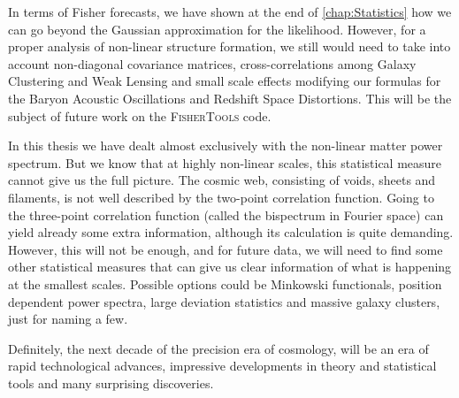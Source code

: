 In terms of Fisher forecasts, we have shown at the end of \cref{chap:Statistics} how we can go beyond the Gaussian approximation for the likelihood.
However, for a proper analysis of non-linear structure formation, we still would need to take into account 
non-diagonal covariance matrices, cross-correlations among Galaxy Clustering and Weak Lensing and small scale effects
modifying our formulas for the Baryon Acoustic Oscillations and Redshift Space Distortions. This will be the subject of future
work on the \textsc{FisherTools} code.

In this thesis we have dealt almost exclusively with the non-linear matter power spectrum. But we know that at highly non-linear scales,
this statistical measure cannot give us the full picture. The cosmic web, consisting of voids, sheets and filaments, is not
well described by the two-point correlation function. Going to the three-point correlation function (called the bispectrum in Fourier space)
can yield already some extra information, although its calculation is quite demanding. 
However, this will not be enough, and for future data, we will need to find
some other statistical measures that can give us clear information of what is happening at the smallest scales.
Possible options could be Minkowski functionals, position dependent power spectra, large deviation statistics and 
massive galaxy clusters, just for naming a few.

Definitely, the next decade of the precision era of cosmology, will be an era of rapid technological advances,
impressive developments in theory and statistical tools and many surprising discoveries.











